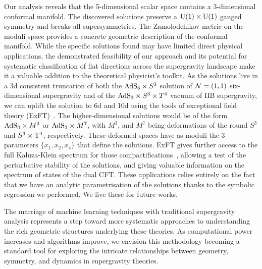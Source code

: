 \documentclass[11pt,a4paper]{article}
\newcommand{\ce}[1]{\marginpar{\parbox{\marginparwidth}{\boldmath $\Longleftarrow$}}{\boldmath\bfseries (ce: #1)}}
\begin{document}
Our analysis reveals that the 5-dimensional scalar space contains a 3-dimensional conformal manifold. The discovered solutions preserve a ${\rm U}(1) \times {\rm U}(1)$ gauged symmetry and breaks all supersymmetries. The Zamolodchikov metric on the moduli space provides a concrete geometric description of the conformal manifold. While the specific solutions found may have limited direct physical applications, the demonstrated feasibility of our approach and its potential for systematic classification of flat directions across the supergravity landscape make it a valuable addition to the theoretical physicist's toolkit. As the solutions live in a 3d consistent truncation of both the ${\rm AdS}_3 \times S^3$ solution of ${\cal N}=(1,1)$ six-dimensional supergravity and of the ${\rm AdS}_3 \times S^3 \times T^4$ vacuum of IIB supergravity, we can uplift the solution to 6d and 10d using the tools of exceptional field theory (ExFT)~\cite{Hohm:2014fxa,Hohm:2014qga,Hohm:2017wtr}. The higher-dimensional solutions would be of the form ${\rm AdS}_3 \times M^3$ or ${\rm AdS}_3 \times M^7$, with $M^{3}$, and $M^{7}$ being deformations of the round $S^{3}$ and $S^{3}\times {\rm T}^{4}$, respectively. These deformed spaces have as moduli the 3 parameters $\{x_{1},x_{2},x_{4}\}$ that define the solutions. ExFT gives further access to the full Kaluza-Klein spectrum for those compactifications~\cite{Malek:2019eaz,Malek:2020yue,Eloy:2020uix}, allowing a test of the perturbative stability of the solutions, and giving valuable information on the spectrum of states of the dual CFT. These applications relies entirely on the fact that we have an analytic parametrisation of the solutions thanks to the symbolic regression we performed. We live these for future works.

The marriage of machine learning techniques with traditional supergravity analysis represents a step toward more systematic approaches to understanding the rich geometric structures underlying these theories. As computational power increases and algorithms improve, we envision this methodology becoming a standard tool for exploring the intricate relationships between geometry, symmetry, and dynamics in supergravity theories. %


\appendix
\end{document}
